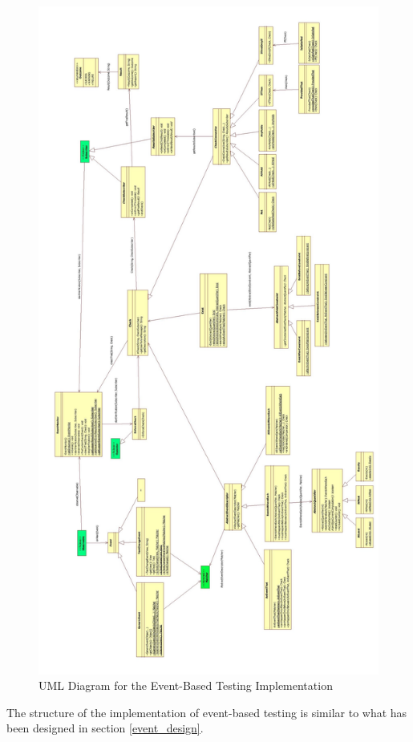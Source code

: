 \documentclass[11pt,a4paper,notitlepage]{article}
\begin{document}
\begin{figure}
  \centering
  \includegraphics[height=\textheight]{Images/Event/UML/Implementation.jpg}
  \caption[Event-Based Testing Implementation UML]{UML Diagram for the Event-Based Testing Implementation}
  \label{fig:event_uml_implementation}
\end{figure}
The structure of the implementation of event-based testing is similar to what has been designed in section \ref{event_design}.
\end{document}
